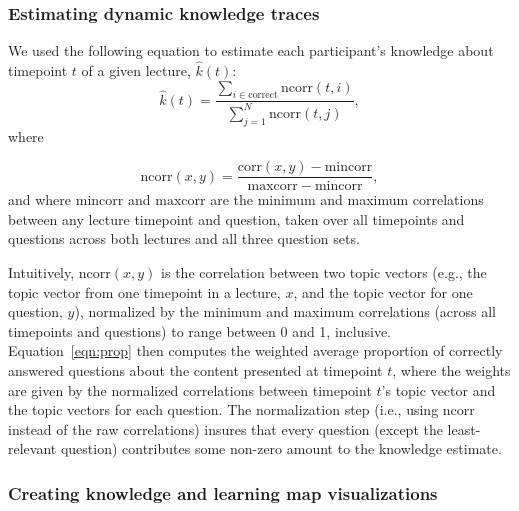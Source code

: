 \documentclass[10pt]{article}
\begin{document}
\subsubsection*{Estimating dynamic knowledge traces}

We used the following equation to estimate each participant's knowledge about
timepoint $t$ of a given lecture, $\hat{k}(t)$:
\begin{equation} 
    \hat{k}(t) = \frac{\sum_{i \in \mathrm{correct}}\mathrm{ncorr}(t, i)}{\sum_{j = 1}^N \mathrm{ncorr}(t, j)},
    \label{eqn:prop}
\end{equation}
where 

\begin{equation} 
    \mathrm{ncorr}(x, y) = \frac{\mathrm{corr}(x, y) - \mathrm{mincorr}}{\mathrm{maxcorr} - \mathrm{mincorr}},
\end{equation} 
and where $\mathrm{mincorr}$ and $\mathrm{maxcorr}$ are the minimum and maximum
correlations between any lecture timepoint and question, taken over all
timepoints and questions across both lectures and all three question sets.

Intuitively, $\mathrm{ncorr}(x, y)$ is the correlation between two topic
vectors (e.g., the topic vector from one timepoint in a lecture, $x$, and the
topic vector for one question, $y$), normalized by the minimum and maximum
correlations (across all timepoints and questions) to range between 0 and 1,
inclusive. Equation~\ref{eqn:prop} then computes the weighted average
proportion of correctly answered questions about the content presented at
timepoint $t$, where the weights are given by the normalized correlations
between timepoint $t$'s topic vector and the topic vectors for each question.
The normalization step (i.e., using $\mathrm{ncorr}$ instead of the raw
correlations) insures that every question (except the least-relevant question)
contributes some non-zero amount to the knowledge estimate.

\subsubsection*{Creating knowledge and learning map visualizations}
\end{document}
